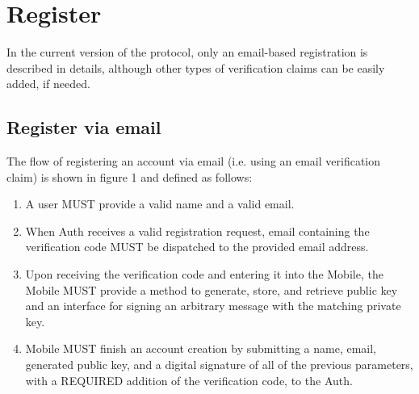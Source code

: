 \section{Register}
 In the current version of the protocol, only an email-based registration is described in details, although 	
other types of verification claims can be easily added, if needed.

    \subsection{Register via email}
    The flow of registering an account via email (i.e. using an email verification claim) is shown in figure 1 and
    defined as follows:
    \begin{enumerate}
        \item A user MUST provide a valid name and a valid email.
        \item When Auth receives a valid registration request, email containing the verification code MUST 
                be dispatched to the provided email address.
        \item Upon receiving the verification code and entering it into the Mobile, the Mobile MUST provide 
                a method to generate, store, and retrieve public key and an interface for signing an arbitrary 
                message with the matching private key.
        \item Mobile MUST finish an account creation by submitting a name, email, generated public key, and 
                a digital signature of all of the previous parameters, with a REQUIRED addition of the 
                verification code, to the Auth.
    \end{enumerate}
  
    

